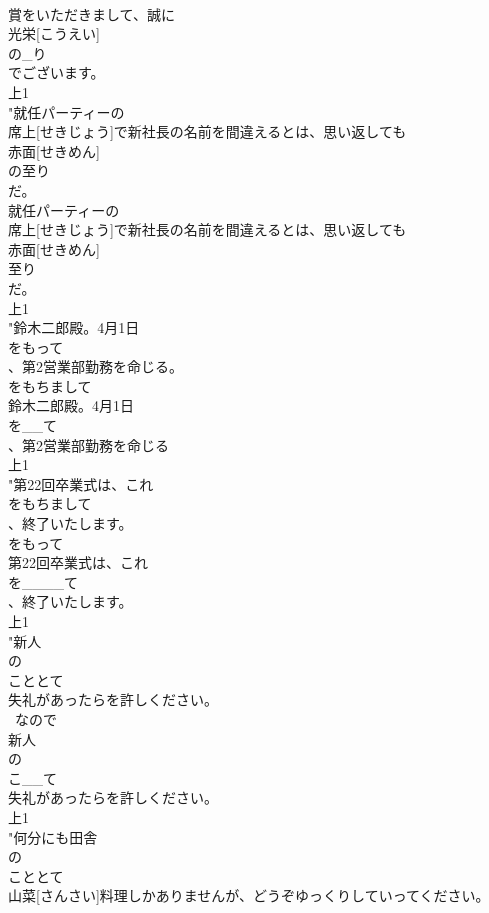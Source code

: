 \documentclass[8pt]{extreport}
\begin{document}
\begin{CJK}{UTF8}{min}
\\	賞をいただきまして、誠に
\\	光栄[こうえい]
\\	の_り
\\	でございます。
\\	上1
\\	"就任パーティーの
\\	席上[せきじょう]で新社長の名前を間違えるとは、思い返しても
\\	赤面[せきめん]
\\	の至り
\\	だ。
\\	就任パーティーの
\\	席上[せきじょう]で新社長の名前を間違えるとは、思い返しても
\\	赤面[せきめん]
\\	至り
\\	だ。
\\	上1
\\	"鈴木二郎殿。4月1日
\\	をもって
\\	、第2営業部勤務を命じる。
\\	をもちまして
\\	鈴木二郎殿。4月1日
\\	を__て
\\	、第2営業部勤務を命じる
\\	上1
\\	"第22回卒業式は、これ
\\	をもちまして
\\	、終了いたします。
\\	をもって
\\	第22回卒業式は、これ
\\	を____て
\\	、終了いたします。
\\	上1
\\	"新人
\\	の
\\	こととて
\\	失礼があったらを許しください。
\\	~なので	
\\	新人
\\	の
\\	こ__て
\\	失礼があったらを許しください。
\\	上1
\\	"何分にも田舎
\\	の
\\	こととて
\\	山菜[さんさい]料理しかありませんが、どうぞゆっくりしていってください。

\end{CJK}
\end{document}

